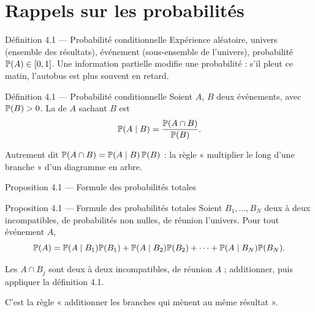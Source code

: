 \section{Rappels sur les probabilités}

\begin{frame}{Définition 4.1 --- Probabilité conditionnelle}
  \small Expérience aléatoire, univers (ensemble des résultats),
  événement (sous-ensemble de l'univers), probabilité
  $\P{A}\in\intff{0}{1}$. Une information partielle modifie une
  probabilité : s'il pleut ce matin, l'autobus est plus souvent en
  retard.
  \begin{Enonce}{Définition 4.1 --- Probabilité conditionnelle}
    Soient $A$, $B$ deux événements, avec $\P{B}>0$. La
     de $A$ sachant $B$ est
    \[
      \P{A\mid B} = \frac{\P{A\cap B}}{\P{B}}.
    \]
  \end{Enonce}
  \small Autrement dit $\P{A\cap B}=\P{A\mid B}\,\P{B}$ : la règle
  « multiplier le long d'une branche » d'un diagramme en arbre.
\end{frame}

\begin{frame}{Proposition 4.1 --- Formule des probabilités totales}
  \begin{Enonce}{Proposition 4.1 --- Formule des probabilités totales}
    Soient $B_1,\dots,B_N$ deux à deux incompatibles, de probabilités non
    nulles, de réunion l'univers. Pour tout événement $A$,
    \[
      \P{A} = \P{A\mid B_1}\P{B_1}+\P{A\mid B_2}\P{B_2}+\cdots
      +\P{A\mid B_N}\P{B_N}.
    \]
  \end{Enonce}
  \begin{AuTableau}
    \small Les $A\cap B_j$ sont deux à deux incompatibles, de réunion $A$ ;
    additionner, puis appliquer la définition 4.1.
  \end{AuTableau}
  \small C'est la règle « additionner les branches qui mènent au même
  résultat ».
\end{frame}

